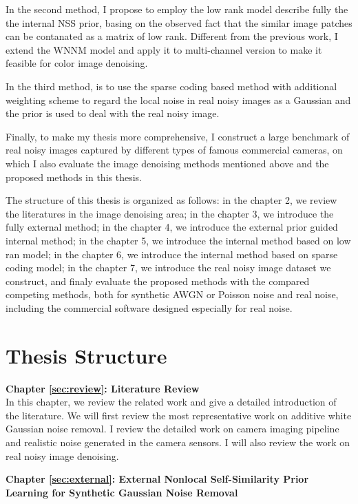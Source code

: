 In the second method, I propose to employ the low rank model describe fully the the internal NSS prior, basing on the observed fact that the similar image patches can be contanated as a matrix of low rank. Different from the previous work, I extend the WNNM model and apply it to multi-channel version to make it feasible for color image denoising. 

In the third method,  is to use the sparse coding based method with additional weighting scheme to regard the local noise in real noisy images as a Gaussian and the prior is used to deal with the real noisy image.

Finally, to make my thesis more comprehensive, I construct a large benchmark of real noisy images captured by different types of famous commercial cameras, on which I also evaluate the image denoising methods mentioned above and the proposed methods in this thesis. 




The structure of this thesis is organized as follows: in the chapter 2, we review the literatures in the image denoising area; in the chapter 3, we introduce the fully external method; in the chapter 4, we introduce the external prior guided internal method; in the chapter 5, we introduce the internal method based on low ran model; in the chapter 6, we introduce the internal method based on sparse coding model; in the chapter 7, we introduce the real noisy image dataset we construct, and finaly evaluate the proposed methods with the compared competing methods, both for synthetic AWGN or Poisson noise and real noise, including the commercial software designed especially for real noise. 


\section{Thesis Structure}
\label{sec:intro:structure}


\textbf{Chapter \ref{sec:review}: Literature Review} \\[0.2em]

In this chapter, we review the related work and give a detailed introduction of the literature. We will first review the most representative work on additive white Gaussian noise removal. I review the detailed work on camera imaging pipeline and realistic noise generated in the camera sensors. I will also review the work on real noisy image denoising.



\textbf{Chapter \ref{sec:external}: External Nonlocal Self-Similarity Prior Learning for Synthetic Gaussian Noise Removal} \\[0.2em]

